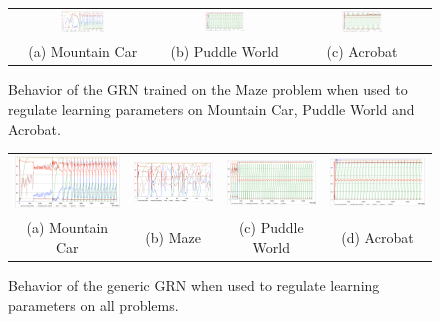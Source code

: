 \begin{figure}[t!]
\centering
\begin{tabular}{ccc}
\includegraphics[width=0.32\textwidth]{MC_GRNMazeBehavior.pdf} &
\includegraphics[width=0.32\textwidth]{PW_GRNMazeBehavior.pdf} &
\includegraphics[width=0.32\textwidth]{ACP_GRNMazeBehavior.pdf} \\
(a) Mountain Car & (b) Puddle World & (c) Acrobat
\end{tabular}
\caption{Behavior of the GRN trained on the Maze problem when used to regulate learning parameters on Mountain Car, Puddle World and Acrobat.}\label{fig:all:GRNMazeBehavior}
\end{figure}

\begin{figure}[b!]
\center
\setlength{\tabcolsep}{0.5mm}
\begin{tabular}{cccc}
\includegraphics[width=0.245\linewidth]{MC_GRNGenericBehavior.pdf} &
\includegraphics[width=0.245\linewidth]{MZ_GRNGenericBehavior.pdf} &
\includegraphics[width=0.245\linewidth]{PW_GRNGenericBehavior.pdf} &
\includegraphics[width=0.245\linewidth]{ACP_GRNGenericBehavior.pdf} \\
(a) Mountain Car & (b) Maze & (c) Puddle World & (d) Acrobat
\end{tabular}
\caption{Behavior of the generic GRN when used to regulate learning parameters on all problems.}\label{fig:GRNGenericBehavior}
\end{figure}

